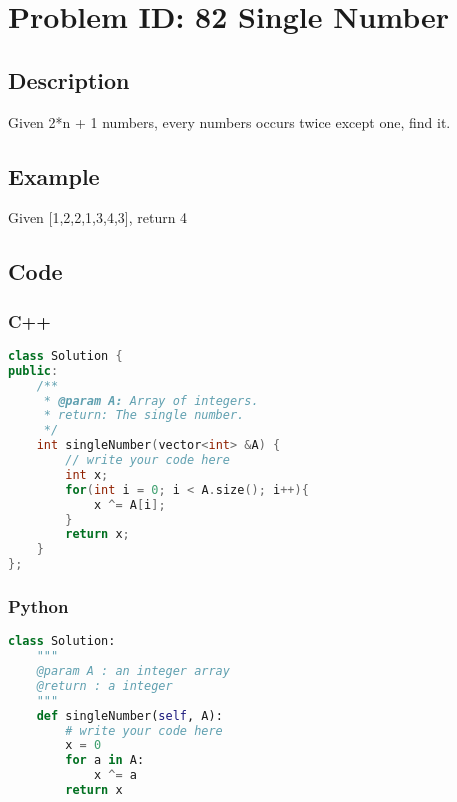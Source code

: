 \section{Problem ID: 82  Single Number}
\subsection{Description}
Given 2*n + 1 numbers, every numbers occurs twice except one, find it.

\subsection{Example}
Given [1,2,2,1,3,4,3], return 4

\subsection{Code}
\scriptsize
\subsubsection{C++}
\begin{lstlisting}[language=C++]
class Solution {
public:
    /**
     * @param A: Array of integers.
     * return: The single number.
     */
    int singleNumber(vector<int> &A) {
        // write your code here
        int x;
        for(int i = 0; i < A.size(); i++){
            x ^= A[i];
        }
        return x;
    }
};
\end{lstlisting}

\subsubsection{Python}
\begin{lstlisting}[language=Python]
class Solution:
	"""
	@param A : an integer array
	@return : a integer
	"""
	def singleNumber(self, A):
		# write your code here
		x = 0
		for a in A:
			x ^= a
		return x
\end{lstlisting}
\normalsize 